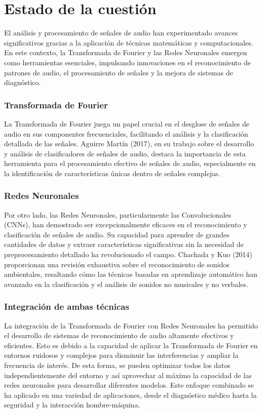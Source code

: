 \section{Estado de la cuestión}
El análisis y procesamiento de señales de audio han experimentado avances significativos gracias a la aplicación de técnicas matemáticas y computacionales. En este contexto, la Transformada de Fourier y las Redes Neuronales emergen como herramientas esenciales, impulsando innovaciones en el reconocimiento de patrones de audio, el procesamiento de señales y la mejora de sistemas de diagnóstico.
\subsubsection*{Transformada de Fourier}
La Transformada de Fourier juega un papel crucial en el desglose de señales de audio en sus componentes frecuenciales, facilitando el análisis y la clasificación detallada de las señales. Aguirre Martín (2017), en su trabajo sobre el desarrollo y análisis de clasificadores de señales de audio, destaca la importancia de esta herramienta para el procesamiento efectivo de señales de audio, especialmente en la identificación de características únicas dentro de señales complejas.
\subsubsection*{Redes Neuronales}
Por otro lado, las Redes Neuronales, particularmente las Convolucionales (CNNs), han demostrado ser excepcionalmente eficaces en el reconocimiento y clasificación de señales de audio. Su capacidad para aprender de grandes cantidades de datos y extraer características significativas sin la necesidad de preprocesamiento detallado ha revolucionado el campo. Chachada y Kuo (2014) proporcionan una revisión exhaustiva sobre el reconocimiento de sonidos ambientales, resaltando cómo las técnicas basadas en aprendizaje automático han avanzado en la clasificación y el análisis de sonidos no musicales y no verbales.
\subsubsection*{Integración de ambas técnicas}
La integración de la Transformada de Fourier con Redes Neuronales ha permitido el desarrollo de sistemas de reconocimiento de audio altamente efectivos y eficientes.
Esto es debido a la capacidad de aplicar la Transformada de Fourier en entornos ruidosos y complejos para disminuir las interferencias y ampliar la frecuencia de interés. De esta forma, se pueden optimizar todos los datos independientemente del entorno y así aprovechar al máximo la capacidad de las redes neuronales para desarrollar diferentes modelos.
Este enfoque combinado se ha aplicado en una variedad de aplicaciones, desde el diagnóstico médico hasta la seguridad y la interacción hombre-máquina.
